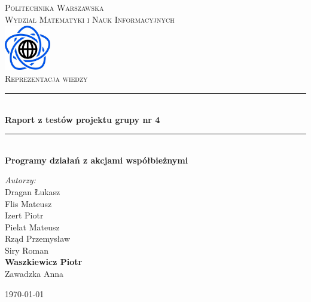 \documentclass{article}
\begin{document}
	
\begin{titlepage}

\newcommand{\HRule}{\rule{\linewidth}{0.5mm}}
\newcommand{\Action}[1]{\textsc{#1}}

\center


\textsc{\LARGE Politechnika Warszawska}\\[0.3cm]
\textsc{\Large Wydział Matematyki i Nauk Informacyjnych}\\[0.6cm]

\includegraphics[width=2cm, height=2cm]{logo}\\[0.6cm]


\textsc{\Huge Reprezentacja wiedzy}\\[0.3cm]


\HRule \\[0.4cm]
{ \LARGE \bfseries Raport z testów projektu grupy nr 4}\\[0.1cm]
 

\HRule \\[0.4cm]
{  \bfseries Programy działań z akcjami współbieżnymi}\\[1.2cm]

\begin{flushright}
\Large \emph{Autorzy:}\\[0.5cm]
Dragan Łukasz\\
Flis Mateusz\\
Izert Piotr\\
Pielat Mateusz\\
Rząd Przemysław\\
Siry Roman\\
\textbf{Waszkiewicz Piotr}\\
Zawadzka Anna\\[0.9cm]

\end{flushright}

\vfill
{\large \today}\\[1cm]
	


\end{titlepage}
	
\end{document}
